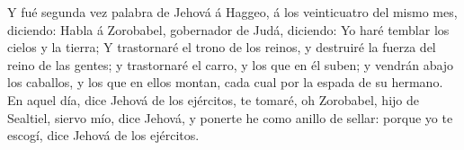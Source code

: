  Y fué segunda vez palabra de Jehová á Haggeo, á los
veinticuatro del mismo mes, diciendo:  Habla á Zorobabel,
gobernador de Judá, diciendo: Yo haré temblar los cielos y la tierra;
 Y trastornaré el trono de los reinos, y destruiré la
fuerza del reino de las gentes; y trastornaré el carro, y los que en él
suben; y vendrán abajo los caballos, y los que en ellos montan, cada
cual por la espada de su hermano.  En aquel día, dice
Jehová de los ejércitos, te tomaré, oh Zorobabel, hijo de Sealtiel,
siervo mío, dice Jehová, y ponerte he como anillo de sellar: porque yo
te escogí, dice Jehová de los ejércitos.
